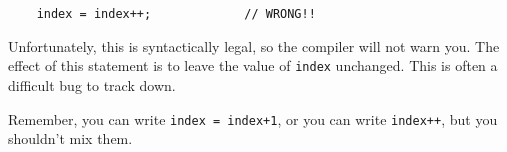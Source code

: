 \begin{lstlisting}
    index = index++;             // WRONG!!
\end{lstlisting}
%
Unfortunately, this is syntactically legal, so the compiler
will not warn you.  The effect of this statement is to leave
the value of {\tt index} unchanged.  This is often a difficult
bug to track down.

Remember, you can write {\tt index = index+1}, or you
can write {\tt index++}, but you shouldn't mix them.







